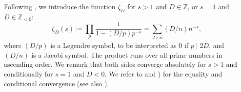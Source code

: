 \documentclass[a4paper]{amsart}
\theoremstyle{definition}
\theoremstyle{plain}
\newtheorem{lemma}[definition]{Lemma}
\newcommand{\ZZ}{\mathbb{Z}}
\newcommand{\dJacobi}[2]{\left(\frac{#1}{#2}\right)}
\begin{document}
Following \cite[§7]{ConwaySloane88}, we introduce the function \(\zeta_D\) for \(s > 1\) and \(D \in \mathbb{Z}\), or \(s=1\) and \(D \in \ZZ_{<0}\):
\[
    \zeta_D(s) \coloneqq \prod_p \frac{1}{1 - (D/p)p^{-s}} = \sum_{2\nmid n} (D/n)n^{-s},
\]
where \((D/p)\) is a Legendre symbol, to be interpreted as \(0\) if \(p \mid 2D\), and \((D/n)\) is a Jacobi symbol. 
The product runs over all prime numbers in ascending order. 
We remark that 
both sides converge absolutely for \(s > 1\) and conditionally for \(s = 1\) and $D<0$. We refer to \cite[\S 109, p.~446, p.~449]{landau} and \cite[p.~153]{kneser}) for the equality and conditional convergence (see also \cite[§12.7]{hua}). 

\end{document}
